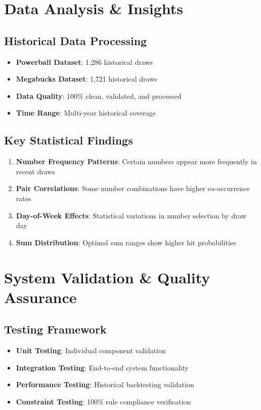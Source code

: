 \documentclass[12pt,a4paper]{article}
\begin{document}
\section{Data Analysis \& Insights}

\subsection{Historical Data Processing}
\begin{itemize}
    \item \textbf{Powerball Dataset}: 1,286 historical draws
    \item \textbf{Megabucks Dataset}: 1,721 historical draws
    \item \textbf{Data Quality}: 100\% clean, validated, and processed
    \item \textbf{Time Range}: Multi-year historical coverage
\end{itemize}

\subsection{Key Statistical Findings}
\begin{enumerate}
    \item \textbf{Number Frequency Patterns}: Certain numbers appear more frequently in recent draws
    \item \textbf{Pair Correlations}: Some number combinations have higher co-occurrence rates
    \item \textbf{Day-of-Week Effects}: Statistical variations in number selection by draw day
    \item \textbf{Sum Distribution}: Optimal sum ranges show higher hit probabilities
\end{enumerate}

\section{System Validation \& Quality Assurance}

\subsection{Testing Framework}
\begin{itemize}
    \item \textbf{Unit Testing}: Individual component validation
    \item \textbf{Integration Testing}: End-to-end system functionality
    \item \textbf{Performance Testing}: Historical backtesting validation
    \item \textbf{Constraint Testing}: 100\% rule compliance verification
\end{itemize}
\end{document}
